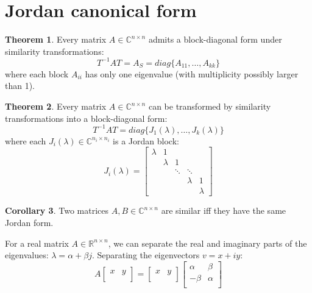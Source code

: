 \documentclass[12pt, openany]{report}
\theoremstyle{definition}
\newtheorem{thm}{Theorem}[chapter]
\newtheorem{corollary}[thm]{Corollary}
\newcommand{\R}{\mathbb{R}}
\newcommand{\C}{\mathbb{C}}
\begin{document}
\section{Jordan canonical form}
\begin{thm}
    Every matrix $A\in \C^{n\times n}$ admits a block-diagonal form under similarity transformations:
    \begin{equation}
        T^{-1}AT = A_S = diag\{A_{11},\dots,A_{kk}\}
    \end{equation}
    where each block $A_{ii}$ has only one eigenvalue (with multiplicity possibly larger than 1).
\end{thm}
\begin{thm}
    Every matrix $A\in \C^{n\times n}$ can be transformed by similarity transformations into a block-diagonal form:
    \begin{equation}
        T^{-1}AT = diag\{J_1(\lambda),\dots,J_k(\lambda)\}
    \end{equation}
    where each $J_i(\lambda)\in \C^{n_i\times n_i}$ is a Jordan block:
    \begin{equation}
        J_i(\lambda) = \begin{bmatrix}
            \lambda & 1 &&&\\
            & \lambda & 1&&\\
            &&\ddots&\ddots&\\
            &&&\lambda & 1\\
            &&&&\lambda
        \end{bmatrix}
    \end{equation}
\end{thm}
\begin{corollary}
    Two matrices $A,B\in \C^{n\times n}$ are similar iff they have the same Jordan form.
\end{corollary}
For a real matrix $A\in \R^{n\times n}$, we can separate the real and imaginary parts of the eigenvalues: $\lambda = \alpha + \beta j$. Separating the eigenvectors $v=x+iy$:
\begin{equation}
    A \begin{bmatrix}
        x & y\\
    \end{bmatrix} = \begin{bmatrix} x & y\\\end{bmatrix} \begin{bmatrix}
    \alpha & \beta\\ -\beta & \alpha\\
    \end{bmatrix}
\end{equation}
\end{document}
